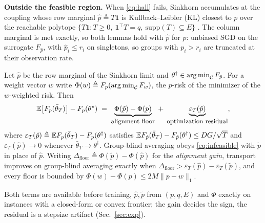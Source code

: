 \noindent\textbf{Outside the feasible region.}
When \eqref{eq:hall} fails, Sinkhorn accumulates at the coupling whose row
marginal $\hat p\triangleq T\mathbf{1}$ is Kullback--Leibler (KL) closest to $p$ over the
reachable polytope $\{T\mathbf{1}: T\ge 0,\ \mathbf{1}^\top T=q,\
\mathrm{supp}(T)\subseteq E\}$ \cite{csiszar1975,gietl2013ipfp,peyre2019}.
The column marginal is met exactly, so both lemmas hold with $\hat p$ for
$p$: unbiased SGD on the surrogate $F_{\hat p}$, with $\hat p_i\le r_i$ on
singletons, so groups with $p_i>r_i$ are truncated at their observation rate.

\begin{theorem}
\label{thm:infeasible}
Let $\hat p$ be the row marginal of the Sinkhorn limit and
$\theta^\dagger\in\operatorname*{arg\,min}_{\mathcal{C}}F_{\hat p}$. For a weight vector $w$
write $\Phi(w)\triangleq F_p(\operatorname*{arg\,min}_{\mathcal{C}} F_w)$, the $p$-risk of the
minimizer of the $w$-weighted risk. Then
\begin{equation}
\mathbb{E}\big[F_p(\bar\theta_T)\big]-F_p(\theta^\star)
\;=\;\underbrace{\Phi(\hat p)-\Phi(p)}_{\textnormal{\small alignment floor}}
\;+\;\underbrace{\varepsilon_T(\hat p)}_{\textnormal{\small optimization residual}} ,
\label{eq:infeasible}
\end{equation}
where $\varepsilon_T(\hat p)\triangleq\mathbb{E} F_p(\bar\theta_T)-F_p(\theta^\dagger)$
satisfies $\mathbb{E} F_{\hat p}(\bar\theta_T)-F_{\hat p}(\theta^\dagger)\le DG/\sqrt{T}$
and $\varepsilon_T(\hat p)\to 0$ whenever $\bar\theta_T\to\theta^\dagger$.
Group-blind averaging obeys \eqref{eq:infeasible} with $\tilde p$ in place of
$\hat p$. Writing $\Delta_{\mathrm{floor}}\triangleq\Phi(\tilde p)-\Phi(\hat p)$
for the \emph{alignment gain}, transport improves on group-blind averaging
exactly when $\Delta_{\mathrm{floor}}>\varepsilon_T(\hat p)-\varepsilon_T(\tilde p)$,
and every floor is bounded by $\Phi(w)-\Phi(p)\le 2M\|p-w\|_1$.
\end{theorem}
\noindent Both terms are available before training, $\hat p,\tilde p$ from
$(p,q,E)$ and $\Phi$ exactly on instances with a closed-form or convex
frontier; the gain decides the sign, the residual is a stepsize artifact
(Sec.~\ref{sec:exp}).
